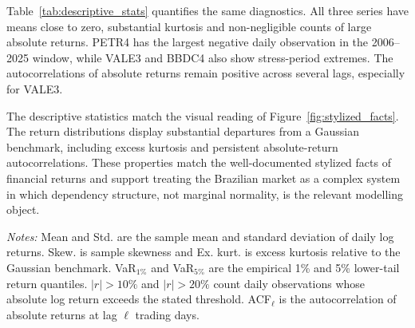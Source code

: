 Table~\ref{tab:descriptive_stats} quantifies the same diagnostics. All three series have means close to zero, substantial kurtosis and non-negligible counts of large absolute returns. PETR4 has the largest negative daily observation in the 2006--2025 window, while VALE3 and BBDC4 also show stress-period extremes. The autocorrelations of absolute returns remain positive across several lags, especially for VALE3.

The descriptive statistics match the visual reading of Figure~\ref{fig:stylized_facts}. The return distributions display substantial departures from a Gaussian benchmark, including excess kurtosis and persistent absolute-return autocorrelations. These properties match the well-documented stylized facts of financial returns \cite{cont_2001_empirical} and support treating the Brazilian market as a complex system in which dependency structure, not marginal normality, is the relevant modelling object.

\begin{center}
\label{tab:descriptive_stats}
\scriptsize
\setlength{\tabcolsep}{2.8pt}
\end{center}

\noindent\footnotesize\emph{Notes:} Mean and Std. are the sample mean and standard deviation of daily log returns. Skew. is sample skewness and Ex. kurt. is excess kurtosis relative to the Gaussian benchmark. VaR$_{1\%}$ and VaR$_{5\%}$ are the empirical 1\% and 5\% lower-tail return quantiles. $|r|>10\%$ and $|r|>20\%$ count daily observations whose absolute log return exceeds the stated threshold. ACF$_\ell$ is the autocorrelation of absolute returns at lag $\ell$ trading days.

